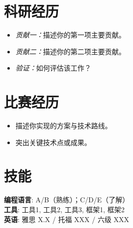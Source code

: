 \documentclass{resume}
\newcommand{\en}[1]{}
\newcommand{\zh}[1]{#1}
\newcommand{\en}[1]{#1}
\newcommand{\zh}[1]{}
\begin{document}
\section{\en{Research Experience}\zh{科研经历}}

\begin{itemize}[parsep=0.25ex]
	\en{\item \textit{Contribution 1:} describe your first main contribution.}
	\zh{\item \textit{贡献一：}描述你的第一项主要贡献。}
	\en{\item \textit{Contribution 2:} describe your second main contribution.}
	\zh{\item \textit{贡献二：}描述你的第二项主要贡献。}
	\en{\item \textit{Validation:} how did you evaluate the work?}
	\zh{\item \textit{验证：}如何评估该工作？}
\end{itemize}

\section{\en{Competitions}\zh{比赛经历}}

\en{\role{Competition Name (Track / Category)}{Award Level}}
\zh{}
\begin{itemize}[parsep=0.25ex]
	\en{\item Describe what you implemented and the technical approach.}
	\zh{\item 描述你实现的方案与技术路线。}
	\en{\item Highlight any notable techniques or results.}
	\zh{\item 突出关键技术点或成果。}
\end{itemize}

\enlargethispage{3\baselineskip}
\section{\en{Skills}\zh{技能}}
\en{\textbf{Languages}: Language A/B (proficient); Language C/D/E (familiar)\\
\textbf{Tools}: Tool 1, Tool 2, Tool 3, Framework 1, Framework 2\\
\textbf{English}: IELTS X.X / TOEFL XXX / CET-6 XXX}
\zh{\textbf{编程语言}: A/B（熟练）；C/D/E（了解）\\
\textbf{工具}: 工具1, 工具2, 工具3, 框架1, 框架2\\
\textbf{英语}: 雅思 X.X / 托福 XXX / 六级 XXX}
\end{document}
